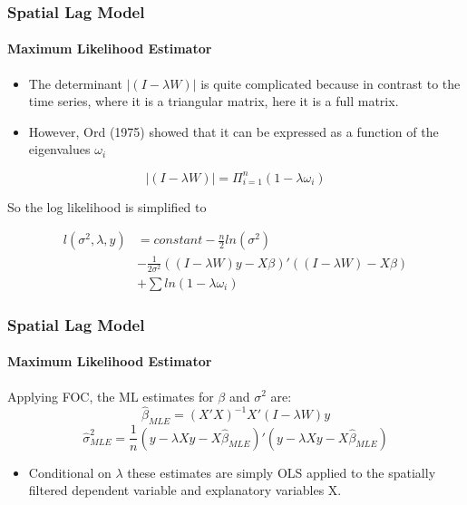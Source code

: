 \documentclass[
  shownotes,
  xcolor={svgnames},
  hyperref={colorlinks,citecolor=DarkBlue,linkcolor=DarkRed,urlcolor=DarkBlue}
  , aspectratio=169]{beamer}
\begin{document}
\begin{frame}[fragile]
\frametitle{Spatial Lag Model}
\framesubtitle{Maximum Likelihood Estimator}

\begin{itemize}
\item The determinant $|(I-\lambda W)|$ is quite complicated because in contrast to the time series, where it is a triangular matrix, here it is a full matrix. 
\item However, Ord (1975) showed that it can be expressed as a function of the eigenvalues $\omega_{i}$
\end{itemize}


\[
|(I-\lambda W)|=\Pi_{i=1}^{n}(1-\lambda\omega_{i})
\]

So the log likelihood is simplified to 

\begin{align}
l\left(\sigma^{2},\lambda,y\right)&=constant-\frac{n}{2}ln\left(\sigma^{2}\right) \nonumber \\
&-\frac{1}{2\sigma^{2}}((I-\lambda W)y-X\beta)'((I-\lambda W)-X\beta) \nonumber \\
&+\sum ln(1-\lambda\omega_{i})
\end{align}

\end{frame}
\begin{frame}[fragile]
\frametitle{Spatial Lag Model}
\framesubtitle{Maximum Likelihood Estimator}

Applying  FOC, the ML estimates for $\beta$ and $\sigma^{2}$ are:
\bigskip
\[
\hat \beta_{MLE}=(X'X)^{-1}X'(I-\lambda W)y
\]
\bigskip
\[
\hat{\sigma}_{MLE}^{2}=\frac{1}{n}(y-\lambda Xy-X \hat{\beta}_{MLE})'(y-\lambda Xy-X \hat{\beta}_{MLE})
\]

\bigskip
\begin{itemize}
\item Conditional on $\lambda$ these estimates are simply OLS applied to the spatially filtered dependent variable and explanatory variables X.
\end{itemize}


\end{frame}
\end{document}

